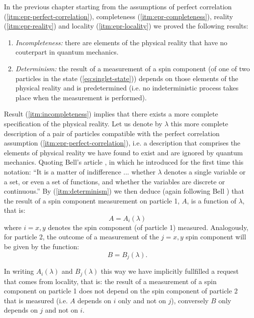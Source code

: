 In the previous chapter starting from the assumptions of perfect correlation (\ref{itm:epr-perfect-correlation}), completeness (\ref{itm:epr-completeness}), reality (\ref{itm:epr-reality}) and locality (\ref{itm:epr-locality}) we proved the following results:
\begin{enumerate}
  \renewcommand{\theenumi}{\roman{enumi}}
  \renewcommand{\labelenumi}{(\theenumi)}
\item \label{itm:incompleteness} \textit{Incompleteness:} there are elements of the physical reality that have no couterpart in quantum mechanics.
\item \label{itm:determinism} \textit{Determinism:} the result of a measurement of a spin component (of one of two particles in the state (\ref{eq:singlet-state})) depends on those elements of the physical reality and is predetermined (i.e. no indeterministic process takes place when the measurement is performed).%
\end{enumerate}
Result (\ref{itm:incompleteness}) implies that there exists a more complete specification of the physical reality. Let us denote by $\lambda$ this more complete description of a pair of particles compatible with the perfect correlation assumption (\ref{itm:epr-perfect-correlation}), i.e. a description that comprises the elements of physical reality we have found to exist and are ignored by quantum mechanics. Quoting Bell's article \cite{Bell1964}, in which he introduced for the first time this notation: ``It is a matter of indifference ... whether $\lambda$ denotes a single variable or a set, or even a set of functions, and whether the variables are discrete or continuous.'' By (\ref{itm:determinism}) we then deduce (again following Bell \cite{Bell1964}) that the result of a spin component measurement on particle 1, $A$, is a function of $\lambda$, that is:
\begin{equation}
  A = A_i(\lambda)
  \label{eq:results-particle-1}
\end{equation}
where $i = x, y$ denotes the spin component (of particle 1) measured. Analogously, for particle 2, the outcome of a measurement of the $j = x, y$ spin component will be given by the function:
\begin{equation}
 B  = B_j(\lambda).
 \label{eq:results-particle-2}
\end{equation}

In writing $A_i(\lambda)$ and $B_j(\lambda)$ this way we have implicitly fullfilled a request that comes from locality, that is: the result of a measurement of a spin component on particle 1 does not depend on the spin component of particle 2 that is measured (i.e. $A$ depends on $i$ only and not on $j$), conversely $B$ only depends on $j$ and not on $i$.%

